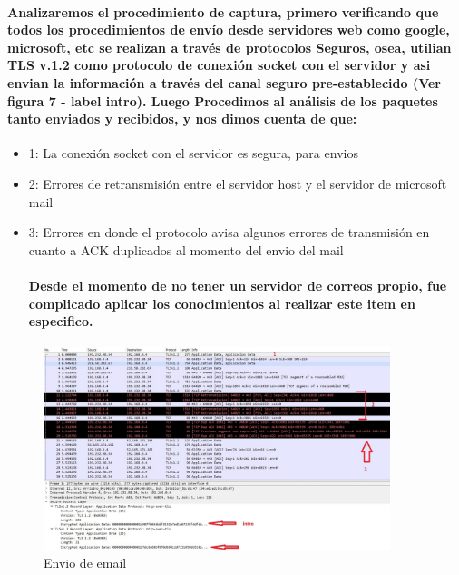 \documentclass[letterpaper]{article}
\begin{document}
\paragraph{Analizaremos el procedimiento de captura, primero verificando que todos los procedimientos de envío desde servidores web como google, microsoft, etc se realizan a través de protocolos Seguros, osea, utilian TLS v.1.2 como protocolo de conexión socket con el servidor y asi envian la información a través del canal seguro pre-establecido (Ver figura 7 - label intro). Luego Procedimos al análisis de los paquetes tanto enviados y recibidos, y nos dimos cuenta de que:}
\begin{itemize}
				
\item{1: La conexión socket con el servidor es segura, para envios }
\item{2: Errores de retransmisión entre el servidor host y el servidor de microsoft mail}
\item{3: Errores en donde el protocolo avisa algunos errores de transmisión en cuanto a ACK duplicados al momento del envio del mail}

\paragraph{Desde el momento de no tener un servidor de correos propio, fue complicado aplicar los conocimientos al realizar este item en especifico.}			


				\end{itemize}



\begin{figure}[h]
	\includegraphics[width=0.9\textwidth]{img/mail-1.jpg}
	\caption{Envio de email}
	\label{figura 7}
\end{figure}
\newpage
\end{document}
